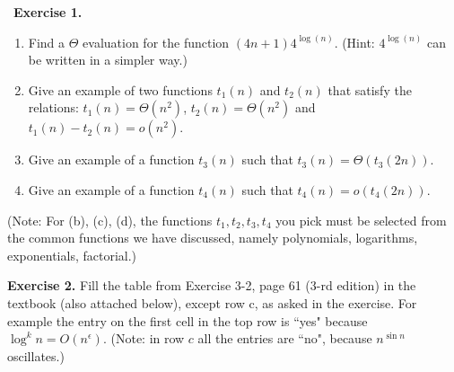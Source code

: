 \documentclass[11pt]{article}
\begin{document}
\
\textbf{Exercise 1.}
\begin{enumerate}[label=\alph*]
\item   Find a $\Theta$ evaluation for the function $(4n + 1) 4^{\log(n)}$. (Hint:  $4^{\log(n)}$ can be written in a simpler way.)
\item  Give an example of two functions $t_1(n)$ and $t_2(n)$ that satisfy the relations:   $t_1(n) = \Theta(n^2)$, $t_2(n) = \Theta(n^2)$ and $t_1(n) - t_2(n) = o(n^2)$.
\item  Give an example of a function $t_3(n)$ such that $t_3(n) = \Theta(t_3(2n))$.
\item   Give an example of a function $t_4(n)$ such that $t_4(n) = o(t_4(2n))$.
 
\end{enumerate}

(Note: For (b), (c), (d), the functions $t_1, t_2, t_3, t_4$ you pick must be selected from the common functions we have discussed, namely polynomials, logarithms, exponentials, factorial.)
\bigskip

\textbf{Exercise 2.}   Fill the table   from Exercise 3-2, page  61 (3-rd edition)  in the textbook (also attached below), except row c, as asked in the exercise.  For example the entry on the first cell in the top row is ``yes" because $\log^k n = O(n^\epsilon)$.  (Note: in row $c$ all the entries are ``no", because $n^{\sin n}$ oscillates.)
\bigskip


\end{document}
